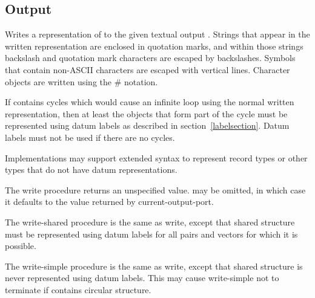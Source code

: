 \subsection{Output}
\label{outputsection}

\noindent \hbox{}
\vspace{-5ex}

\begin{entry}{%
}

Writes a representation of  to the given textual output
.  Strings
that appear in the written representation are enclosed in quotation marks, and
within those strings backslash and quotation mark characters are
escaped by backslashes.  Symbols that contain non-ASCII characters
are escaped with vertical lines.
Character objects are written using the {\cf \#\backwhack} notation.

If  contains cycles which would cause an infinite loop using
the normal written representation, then at least the objects that form
part of the cycle must be represented using datum labels as described
in section~\ref{labelsection}.  Datum labels must not be used if there
are no cycles.

Implementations may support extended syntax to represent record types or
other types that do not have datum representations.

The {\cf write} procedure returns an unspecified value.
 may be omitted, in which case it defaults to the value
returned by {\cf current-output-port}.

\end{entry}

\begin{entry}{%
}

The {\cf write-shared} procedure is the same as {\cf write}, except that
shared structure must be represented using datum labels for all pairs
and vectors for which it is possible.

\end{entry}

\begin{entry}{%
}

The {\cf write-simple} procedure is the same as {\cf write}, except that shared structure is
never represented using datum labels.  This may cause {\cf write-simple} not to
terminate if  contains circular structure.

\end{entry}


